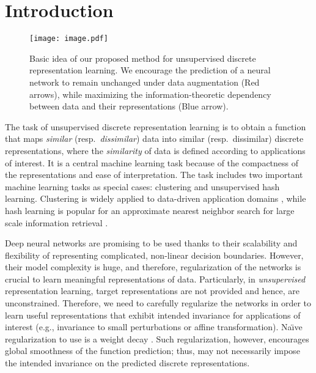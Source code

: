 \documentclass{article}
\theoremstyle{plain}
\begin{document}
\section{Introduction}
\begin{figure}[ht]\label{fig:image}
\begin{center}
\centerline{\texttt{[image: image.pdf]}}
\caption{Basic idea of our proposed method for unsupervised discrete representation learning. We encourage the prediction of a neural network to remain unchanged under data augmentation (Red arrows), while maximizing the information-theoretic dependency between data and their representations (Blue arrow).}
\end{center}
\vspace{-1cm}
\end{figure} 


The task of unsupervised discrete representation learning is to obtain a function that maps \emph{similar} (resp.~\emph{dissimilar}) data into similar (resp.~dissimilar) discrete representations, where the \emph{similarity} of data is defined according to applications of interest.
It is a central machine learning task because of the compactness of the representations and ease of interpretation.  The task includes two important machine learning tasks as special cases: clustering and unsupervised hash learning. 
Clustering is widely applied to data-driven application domains \citep{berkhin2006survey}, while hash learning is popular for an approximate nearest neighbor search for large scale information retrieval \citep{wang2016learning}. 

Deep neural networks are promising to be used thanks to their scalability and flexibility of representing complicated, non-linear decision boundaries.
However, their model complexity is huge, and therefore, regularization of the networks is crucial to learn meaningful representations of data.
Particularly, in \emph{unsupervised} representation learning, target representations are not provided and hence, are unconstrained.
Therefore, we need to carefully regularize the networks in order to learn useful representations that exhibit intended invariance for applications of interest (e.g., invariance to small perturbations or affine transformation).
Na\"{\i}ve regularization to use is a weight decay \citep{erin2015deep}.
Such regularization, however, encourages global smoothness of the function prediction; thus, may not necessarily impose the intended invariance on the predicted discrete representations.
\end{document}

